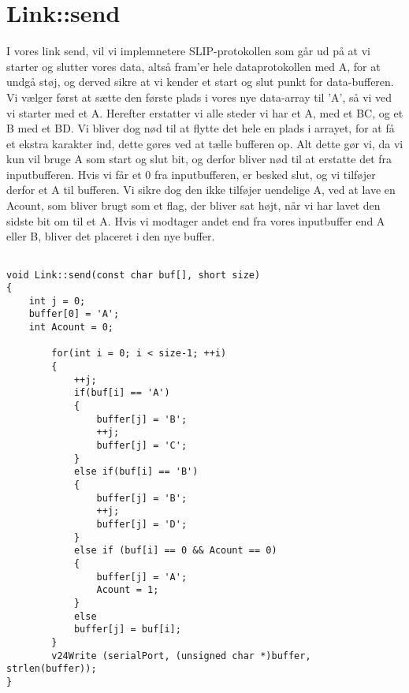 \graphicspath{{Chapters/Barnevogn/}}

\chapter{Link::send}

\lstset{language=C++}          %


I vores link send, vil vi implemnetere SLIP-protokollen som går ud på at vi starter og slutter vores data, altså fram'er hele dataprotokollen med A, for at undgå støj, og derved sikre at vi kender et start og slut punkt for data-bufferen. Vi vælger først at sætte den første plads i vores nye data-array til 'A', så vi ved vi starter med et A. Herefter erstatter vi alle steder vi har et A, med et BC, og et B med et BD. Vi bliver dog nød til at flytte det hele en plads i arrayet, for at få et ekstra karakter ind, dette gøres ved at tælle bufferen op. Alt dette gør vi, da vi kun vil bruge A som start og slut bit, og derfor bliver nød til at erstatte det fra inputbufferen. Hvis vi får et 0 fra inputbufferen, er besked slut, og vi tilføjer derfor et A til bufferen. Vi sikre dog den ikke tilføjer uendelige A, ved at lave en Acount, som bliver brugt som et flag, der bliver sat højt, når vi har lavet den sidste bit om til et A. Hvis vi modtager andet end fra vores inputbuffer end A eller B, bliver det placeret i den nye buffer.   



\begin{lstlisting}[frame=single]  % Start your code-block

void Link::send(const char buf[], short size)
{
	int j = 0;
	buffer[0] = 'A';
    int Acount = 0;

        for(int i = 0; i < size-1; ++i)
		{
			++j;
			if(buf[i] == 'A')
			{
				buffer[j] = 'B';
				++j;
				buffer[j] = 'C';
			}
			else if(buf[i] == 'B')
			{
				buffer[j] = 'B';
				++j;
                buffer[j] = 'D';
			}
            else if (buf[i] == 0 && Acount == 0)
            {
                buffer[j] = 'A';
                Acount = 1;
            }
			else
			buffer[j] = buf[i];
		}
        v24Write (serialPort, (unsigned char *)buffer, strlen(buffer));
}
\end{lstlisting}



